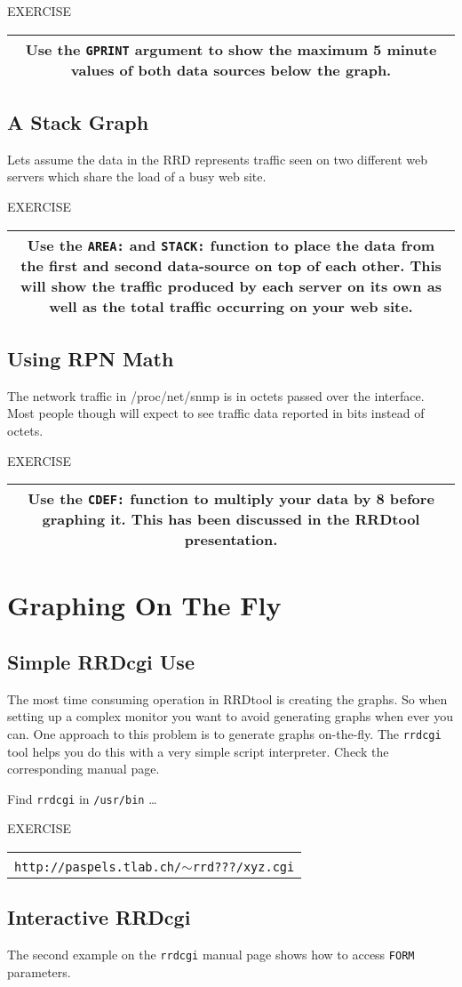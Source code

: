 \documentclass[a4paper,12pt]{article}
\newenvironment{work}{\textsf{\tiny EXERCISE}\nopagebreak\\[0.3ex]\begin{tabular}{|c|}
 \hline
 \begin{minipage}{0.965\linewidth}%
 \setlength{\parskip}{1.6ex plus 0.6ex minus 0.4ex}%
 \rule{0pt}{2.8ex}\ignorespaces}
{\rule[-1.8ex]{0pt}{0pt}\end{minipage}\\
 \hline
 \end{tabular}}
\newcommand{\ex}[1]{\subsection{#1}}
\newcommand{\cmd}[1]{\texttt{\mbox{#1}}}
\newcommand\ti{$\sim$}   %
\begin{document}
\begin{work}
  Use the \cmd{GPRINT} argument to show the maximum 5 minute values of
  both data sources below the graph.
\end{work}

\ex{A Stack Graph}
Lets assume the data in the RRD represents traffic seen on two
different web servers which share the load of a busy web site.

\begin{work}
  Use the \cmd{AREA:} and \cmd{STACK:} function to place the data from
  the first and second data-source on top of each other. This will
  show the traffic produced by each server on its own as well as the
  total traffic occurring on your web site.
\end{work}

\ex{Using RPN Math}

The network traffic in /proc/net/snmp is in octets passed over the
interface. Most people though will expect to see traffic data reported in
bits instead of octets.

\begin{work}
Use the \cmd{CDEF:} function to multiply your data by 8
before graphing it. This has been discussed in the RRDtool
presentation.
\end{work}

\section{Graphing On The Fly}
\ex{Simple RRDcgi Use} 

The most time consuming operation in RRDtool is creating the graphs.
So when setting up a complex monitor you want to avoid generating
graphs when ever you can. One approach to this problem is to generate
graphs on-the-fly. The \cmd{rrdcgi} tool helps you do this with a very
simple script interpreter. Check the corresponding manual page.

Find \cmd{rrdcgi} in \cmd{/usr/bin} \ldots

\begin{work}
  Write a \cmd{rrdcgi} input file which generates the stacked graph
  you did in the last example. Check the effect of the \texttt{--lazy}
  option. You can test your input file by putting it into 
  \cmd{httpd/htdocs/xyz.cgi} and then calling\\
  \cmd{http://paspels.tlab.ch/\ti{}rrd???/xyz.cgi}
\end{work}

\ex{Interactive RRDcgi}
The second example on the \cmd{rrdcgi} manual page shows how to access
\cmd{FORM} parameters.
\end{document}

